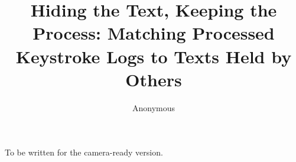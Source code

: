 \documentclass[sigconf,review]{acmart}
\begin{document}
\title[Matching processed keystroke logs to texts]{Hiding the Text, Keeping the Process: Matching Processed
Keystroke Logs to Texts Held by Others}

\ifdefined\authorfile

\else
\author{Anonymous}

\renewcommand{\shortauthors}{Anonymous}
\fi

\begin{abstract}

\end{abstract}


\maketitle











\appendix

\begin{acks}
To be written for the camera-ready version.
\end{acks}













\end{document}
